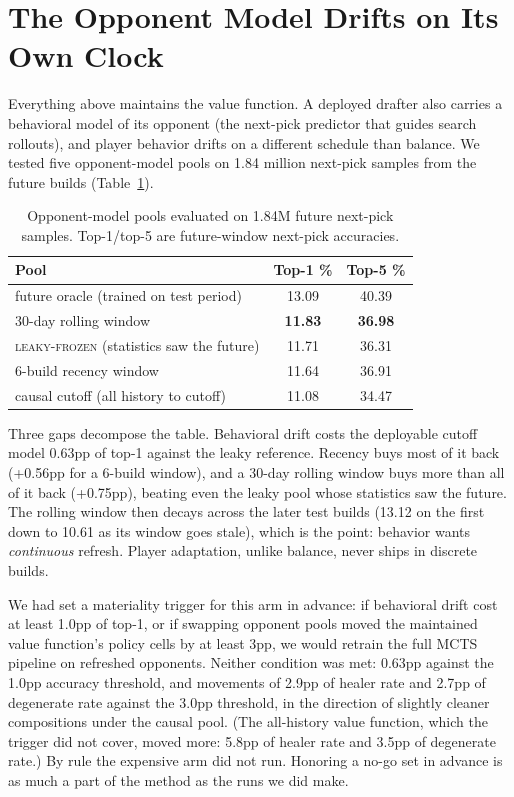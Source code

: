 \documentclass[journal]{IEEEtran}
\newcommand{\leakyfrozen}{\textsc{leaky-frozen}}
\begin{document}
\section{The Opponent Model Drifts on Its Own Clock}
\label{sec:opponent}

Everything above maintains the value function. A deployed drafter also
carries a behavioral model of its opponent (the next-pick predictor that
guides search rollouts), and player behavior drifts on a different
schedule than balance. We tested five opponent-model pools on 1.84
million next-pick samples from the future builds
(Table~\ref{tab:gdpools}).

\begin{table}[t]
\caption{Opponent-model pools evaluated on 1.84M future next-pick
samples. Top-1/top-5 are future-window next-pick accuracies.}
\label{tab:gdpools}
\centering
\small
\setlength{\tabcolsep}{4pt}
\begin{tabular}{lcc}
\toprule
Pool & Top-1 \% & Top-5 \% \\
\midrule
future oracle (trained on test period) & 13.09 & 40.39 \\
30-day rolling window & \textbf{11.83} & \textbf{36.98} \\
\leakyfrozen{} (statistics saw the future) & 11.71 & 36.31 \\
6-build recency window & 11.64 & 36.91 \\
causal cutoff (all history to cutoff) & 11.08 & 34.47 \\
\bottomrule
\end{tabular}
\end{table}

Three gaps decompose the table. Behavioral drift costs the deployable
cutoff model 0.63pp of top-1 against the leaky reference. Recency buys
most of it back (+0.56pp for a 6-build window), and a 30-day rolling
window buys more than all of it back (+0.75pp), beating even the leaky
pool whose statistics saw the future. The rolling window then decays
across the later test builds (13.12 on the first down to 10.61 as its
window goes stale), which is the point: behavior wants
\emph{continuous} refresh. Player adaptation, unlike balance, never
ships in discrete builds.

We had set a materiality trigger for this arm in advance: if
behavioral drift cost at least 1.0pp of top-1, or if swapping opponent
pools moved the maintained value function's policy cells by at least
3pp, we would retrain the full MCTS pipeline on refreshed opponents.
Neither condition was met: 0.63pp against the 1.0pp accuracy threshold,
and movements of 2.9pp of healer rate and 2.7pp of degenerate rate
against the 3.0pp threshold, in the direction of slightly cleaner
compositions under the causal pool. (The all-history value function,
which the trigger did not cover, moved more: 5.8pp of healer rate and
3.5pp of degenerate rate.) By rule the expensive arm did not run.
Honoring a no-go set in advance is as much a part of the method as the
runs we did make.
\end{document}
